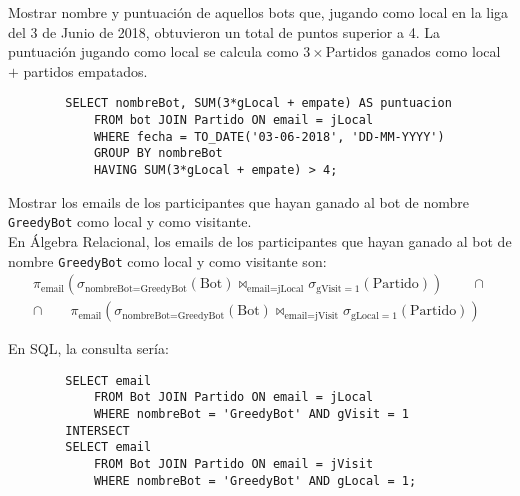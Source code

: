 \documentclass[12pt]{article}
\begin{document}
\begin{ejercicio}[SQL]
    Mostrar nombre y puntuación de aquellos bots que, jugando como local en la liga del 3 de Junio de 2018, obtuvieron un total de puntos superior a 4. La puntuación jugando como local se calcula como $3\times$Partidos ganados como local $+$ partidos empatados.
    \begin{verbatim}
        SELECT nombreBot, SUM(3*gLocal + empate) AS puntuacion
            FROM bot JOIN Partido ON email = jLocal
            WHERE fecha = TO_DATE('03-06-2018', 'DD-MM-YYYY')
            GROUP BY nombreBot
            HAVING SUM(3*gLocal + empate) > 4;
    \end{verbatim}
\end{ejercicio}

\begin{ejercicio}[AR y SQL]
    Mostrar los emails de los participantes que hayan ganado al bot de nombre \verb|GreedyBot| como local y como visitante.\\

    En Álgebra Relacional, los emails de los participantes que hayan ganado al bot de nombre \verb|GreedyBot| como local y como visitante son:
    \begin{multline*}
        \pi_{\text{email}}\left(\sigma_{\text{nombreBot}=\text{GreedyBot}}(\text{Bot})\bowtie_{\text{email}=\text{jLocal}}\sigma_{\text{gVisit}=1}(\text{Partido})\right)
        \qquad \cap\\
        \cap\qquad \pi_{\text{email}}\left(\sigma_{\text{nombreBot}=\text{GreedyBot}}(\text{Bot})\bowtie_{\text{email}=\text{jVisit}}\sigma_{\text{gLocal}=1}(\text{Partido})\right)
    \end{multline*}

    En SQL, la consulta sería:
    \begin{verbatim}
        SELECT email
            FROM Bot JOIN Partido ON email = jLocal
            WHERE nombreBot = 'GreedyBot' AND gVisit = 1
        INTERSECT
        SELECT email
            FROM Bot JOIN Partido ON email = jVisit
            WHERE nombreBot = 'GreedyBot' AND gLocal = 1;
    \end{verbatim}
\end{ejercicio}
\end{document}
